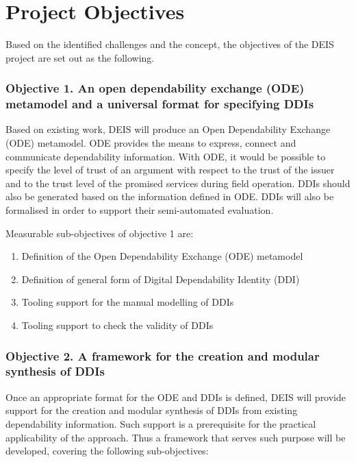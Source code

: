 \section{Project Objectives}
\label{section4}
Based on the identified challenges and the concept, the objectives of the DEIS project are set out as the following.

\subsubsection{Objective 1. An open dependability exchange (ODE) metamodel and a universal format for specifying DDIs} 
Based on existing work, DEIS will produce an Open Dependability Exchange (ODE) metamodel. ODE provides the means to express, connect and communicate dependability information.  
With ODE, it would be possible to specify the level of trust of an argument with respect to the trust of the issuer and to the trust level of the promised services during field operation. DDIs should also be generated based on the information defined in ODE. 
DDIs will also be formalised in order to support their semi-automated evaluation.

Measurable sub-objectives of objective 1 are:
\begin{enumerate}
	\item Definition of the Open Dependability Exchange (ODE) metamodel
	\item Definition of general form of Digital Dependability Identity (DDI)
	\item Tooling support for the manual modelling of DDIs
	\item Tooling support to check the validity of DDIs
\end{enumerate}

\subsubsection{Objective 2. A framework for the creation and modular synthesis of DDIs}
Once an appropriate format for the ODE and DDIs is defined, DEIS will provide support for the creation and modular synthesis of DDIs from existing dependability information. Such support is a prerequisite for the practical applicability of the approach. Thus a framework that serves such purpose will be developed, covering the following sub-objectives:

